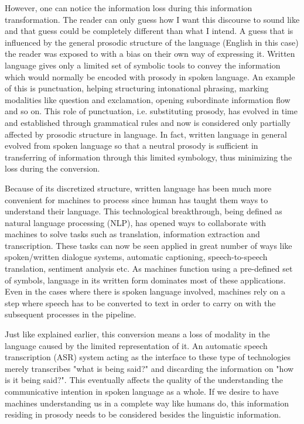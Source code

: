 However, one can notice the information loss during this information transformation. The reader can only guess how I want this discourse to sound like and that guess could be completely different than what I intend. A guess that is influenced by the general prosodic structure of the language (English in this case) the reader was exposed to with a bias on their own way of expressing it.  Written language gives only a limited set of symbolic tools to convey the information which would normally be encoded with prosody in spoken language. An example of this is punctuation, helping structuring intonational phrasing, marking modalities like question and exclamation, opening subordinate information flow and so on. This role of punctuation, i.e. substituting prosody, has evolved in time and established through grammatical rules and now is considered only partially affected by prosodic structure in language. In fact, written language in general evolved from spoken language so that a neutral prosody is sufficient in transferring of information through this limited symbology, thus minimizing the loss during the conversion. 

Because of its discretized structure, written language has been much more convenient for machines to process since human has taught them ways to understand their language. This technological breakthrough, being defined as natural language processing (NLP), has opened ways to collaborate with machines to solve tasks such as translation, information extraction and transcription. These tasks can now be seen applied in great number of ways like spoken/written dialogue systems, automatic captioning, speech-to-speech translation, sentiment analysis etc. As machines function using a pre-defined set of symbols, language in its written form dominates most of these applications. Even in the cases where there is spoken language involved, machines rely on a step where speech has to be converted to text in order to carry on with the subsequent processes in the pipeline. 

Just like explained earlier, this conversion means a loss of modality in the language caused by the limited representation of it. An automatic speech transcription (ASR) system acting as the interface to these type of technologies merely transcribes "what is being said?" and discarding the information on "how is it being said?". This eventually affects the quality of the understanding the communicative intention in spoken language as a whole. If we desire to have machines understanding us in a complete way like humans do, this information residing in prosody needs to be considered besides the linguistic information. 

